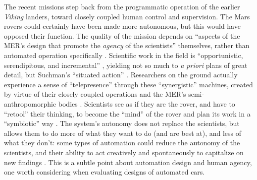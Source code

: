 The recent missions step back
from the programmatic operation of the earlier \emph{Viking} landers, toward closely
coupled human control and
supervision. The Mars rovers could
certainly have been made more autonomous, but this would have opposed
their function. The quality of the mission depends on ``aspects of the
MER's design that promote the \emph{agency} of the scientists''
themselves, rather than automated operation specifically \cite[p.
  xii]{clancey}. Scientific work in the field is ``opportunistic, 
serendipitous, and incremental'' \cite[p. 32]{clancey}, yielding
not so much to \emph{a priori}
plans of great detail, but Suchman's ``situated
action'' \cite{suchmanSA}. Researchers on the ground actually
experience a sense of ``telepresence'' through these ``synergistic''
machines, created 
by virtue of their closely coupled operations and the MER's
semi-anthropomorphic bodies \cite[p. 55]{clancey}. Scientists see
as if they are the rover, and have to ``retool'' their thinking, to
become the ``mind'' of the rover and plan its work in a ``symbiotic''
way \cite[p. 106, 110, 118]{clancey}. The system's autonomy does not replace the
scientists, but allows them to do more of what they want to do (and are
best at), and less of what they don't: some types of automation could reduce the
autonomy of the scientists, and their ability to act creatively and
spontaneously to capitalize on new findings \cite[p.
  118-119]{clancey}. This is a subtle point about automation design
and human agency, one
worth considering when evaluating designs of automated cars.


